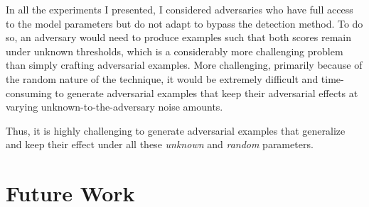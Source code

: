 In all the experiments I presented, I considered adversaries who have full
access to the model parameters but do not adapt to bypass the detection method.
To do so, an adversary would need to produce examples such that both scores
remain under unknown thresholds, which is a considerably more challenging
problem than simply crafting adversarial examples. More challenging, primarily
because of the random nature of the technique, it would be extremely difficult
and time-consuming to generate adversarial examples that keep their adversarial
effects at varying unknown-to-the-adversary noise amounts.

Thus, it is highly challenging to generate adversarial examples that generalize
and keep their effect under all these \emph{unknown} and \emph{random}
parameters.

\clearpage
\section{Future Work}

